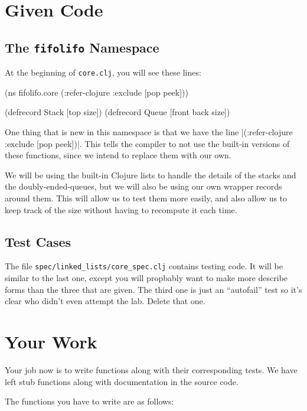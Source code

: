 \documentclass[12pt]{article}
\begin{document}
\section{Given Code}

\subsection{The \texttt{fifolifo} Namespace}

At the beginning of \texttt{core.clj}, you will see these lines:

\begin{clojurecode}
(ns fifolifo.core
   (:refer-clojure :exclude [pop peek]))

(defrecord Stack [top size])
(defrecord Queue [front back size])
\end{clojurecode}

One thing that is new in this namespace is that we have the line
|(:refer-clojure :exclude [pop peek])|.  This tells the compiler to not use the
built-in versions of these functions, since we intend to replace them with our own.

We will be using the built-in Clojure lists to handle the details of the stacks and the
doubly-ended-queues, but we will also be using our own wrapper records around them.  This will
allow us to test them more easily, and also allow us to keep track of the size without having
to recompute it each time.

\subsection{Test Cases}

The file \texttt{spec/linked\_lists/core\_spec.clj} contains testing code.  It will be similar
to the last one, except you will propbably want to make more describe forms than
the three that are given.  The third one is just an ``autofail'' test so it's clear who didn't even
attempt the lab.  Delete that one.

\section{Your Work}

Your job now is to write functions along with their corresponding tests.  We have left stub
functions along with documentation in the source code.  

The functions you have to write are as follows:
\end{document}
